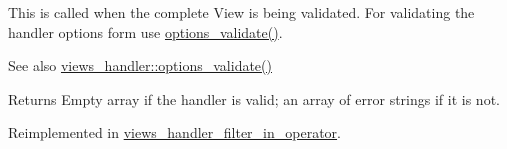 This is called when the complete View is being validated. For validating the handler options form use \hyperlink{classviews__handler_a831c00b8cd3c667e25db014a3413273c}{options\_\-validate()}.

\begin{DoxySeeAlso}{See also}
\hyperlink{classviews__handler_a831c00b8cd3c667e25db014a3413273c}{views\_\-handler::options\_\-validate()}
\end{DoxySeeAlso}
\begin{DoxyReturn}{Returns}
Empty array if the handler is valid; an array of error strings if it is not. 
\end{DoxyReturn}


Reimplemented in \hyperlink{classviews__handler__filter__in__operator_a5d2cc4d0420cc3a8949e371c694230d3}{views\_\-handler\_\-filter\_\-in\_\-operator}.

